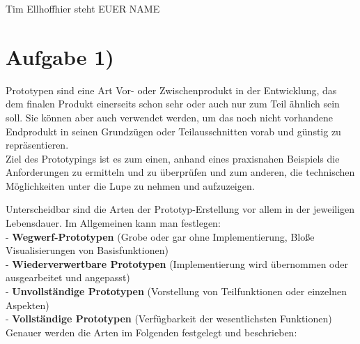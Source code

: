 \documentclass{swp1}
\begin{document}
          {Tim Ellhoff}{hier steht EUER NAME}{}
          
\section*{Aufgabe 1)}

Prototypen sind eine Art Vor- oder Zwischenprodukt in der Entwicklung, das dem finalen Produkt einerseits schon sehr oder auch nur zum Teil ähnlich sein soll. Sie können aber auch verwendet werden, um das noch nicht vorhandene Endprodukt in seinen Grundzügen oder Teilausschnitten vorab und günstig zu repräsentieren.\\
Ziel des Prototypings ist es zum einen, anhand eines praxisnahen Beispiels die Anforderungen zu ermitteln und zu überprüfen und zum anderen, die technischen Möglichkeiten unter die Lupe zu nehmen und aufzuzeigen. 

Unterscheidbar sind die Arten der Prototyp-Erstellung vor allem in der jeweiligen Lebensdauer. Im Allgemeinen kann man festlegen:\\

- \textbf{Wegwerf-Prototypen} (Grobe oder gar ohne Implementierung, Bloße Visualisierungen von Basisfunktionen) \\

- \textbf{Wiederverwertbare Prototypen} (Implementierung wird übernommen oder ausgearbeitet und angepasst)\\

- \textbf{Unvollständige Prototypen}  (Vorstellung von Teilfunktionen oder einzelnen Aspekten)\\

- \textbf{Vollständige Prototypen}  (Verfügbarkeit der wesentlichsten Funktionen)\\

Genauer werden die Arten im Folgenden festgelegt und beschrieben:\\
\end{document}
